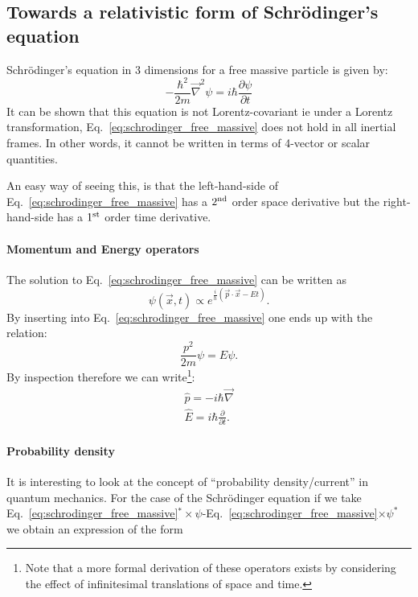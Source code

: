 \subsection{Towards a relativistic form of Schr\"odinger's equation}

Schr\"odinger's equation in 3 dimensions for a free massive particle is given by:
\begin{equation}
\label{eq:schrodinger_free_massive}
-\frac{\hbar^2}{2m}\vec{\nabla}^2\psi=i\hbar\frac{\partial\psi}{\partial t}
\end{equation}
It can be shown that this equation is not Lorentz-covariant ie under a Lorentz transformation, Eq.~\ref{eq:schrodinger_free_massive} does not hold in all inertial frames. In other words, it cannot be written in terms of 4-vector or scalar quantities.

An easy way of seeing this, is that the left-hand-side of Eq.~\ref{eq:schrodinger_free_massive} has a $2^{\rm nd}$ order space derivative but the right-hand-side has a $1^{\rm st}$ order time derivative.

\paragraph{Momentum and Energy operators}
The solution to Eq.~\ref{eq:schrodinger_free_massive} can be written as
\[
\psi(\vec{x},t)\propto e^{\frac{i}{h}(\vec{p}\cdot\vec{x}-E t)}.
\]
By inserting into Eq.~\ref{eq:schrodinger_free_massive} one ends up with the relation:
\[
\frac{p^2}{2m}\psi=E\psi.
\]
By inspection therefore we can write\footnote{Note that a more formal derivation of these operators exists by considering the effect of infinitesimal translations of space and time.}:
\begin{eqnarray}
\label{eq:mom_operator}
\hat{p}=-i\hbar\vec{\nabla}\\
\hat{E}=i\hbar\frac{\partial}{\partial t}.
\end{eqnarray}

\paragraph{Probability density}

It is interesting to look at the concept of ``probability density/current'' in quantum mechanics.
For the case of the Schr\"odinger equation if we take Eq.~\ref{eq:schrodinger_free_massive}$^*\times\psi$-Eq.~\ref{eq:schrodinger_free_massive}$\times\psi^*$ we obtain an expression of the form

